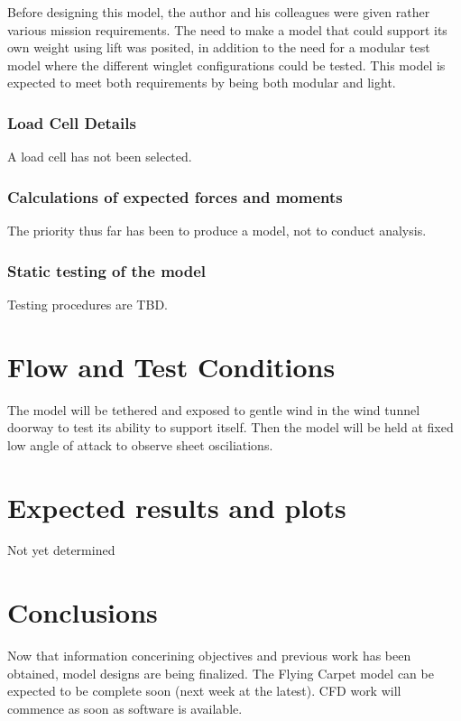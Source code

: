\documentclass[12pt]{report} %
\begin{document}
Before designing this model, the author and his colleagues were given rather various mission requirements.  The need to make a model that
could support its own weight using lift was posited, in addition to the need for a modular test model where the different winglet configurations
could be tested.  This model is expected to meet both requirements by being both modular and light.

\subsection{Load Cell Details}
A load cell has not been selected.

\subsection{Calculations of expected forces and moments}
The priority thus far has been to produce a model, not to conduct analysis.

\subsection{Static testing of the model}
Testing procedures are TBD.

\chapter{Flow and Test Conditions}

The model will be tethered and exposed to gentle wind in the wind tunnel doorway to test its ability to support itself.
 Then the model will be held at fixed low angle of attack to observe sheet osciliations.

\chapter{Expected results and plots}
Not yet determined


\chapter{Conclusions}

Now that information concerining objectives and previous work has been obtained, model designs are being finalized.  The Flying Carpet model
can be expected to be complete soon (next week at the latest).  CFD work will commence as soon as software is available.

\begin{thebibliography}{9}
\end{thebibliography}
\end{document}
